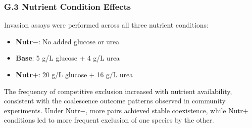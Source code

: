 \subsubsection*{G.3 Nutrient Condition Effects}

Invasion assays were performed across all three nutrient conditions:
\begin{itemize}
    \item \textbf{Nutr$-$}: No added glucose or urea
    \item \textbf{Base}: 5 g/L glucose + 4 g/L urea
    \item \textbf{Nutr$+$}: 20 g/L glucose + 16 g/L urea
\end{itemize}

The frequency of competitive exclusion increased with nutrient availability, consistent with the coalescence outcome patterns observed in community experiments. Under Nutr$-$, more pairs achieved stable coexistence, while Nutr$+$ conditions led to more frequent exclusion of one species by the other.

